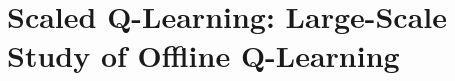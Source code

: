 \documentclass[../thesis.tex]{subfiles}
\begin{document}
\vspace{-0.2cm}
\section{Scaled Q-Learning: Large-Scale Study of Offline Q-Learning}
\label{sec:scaled_section}
\vspace{-0.2cm}

\end{document}
